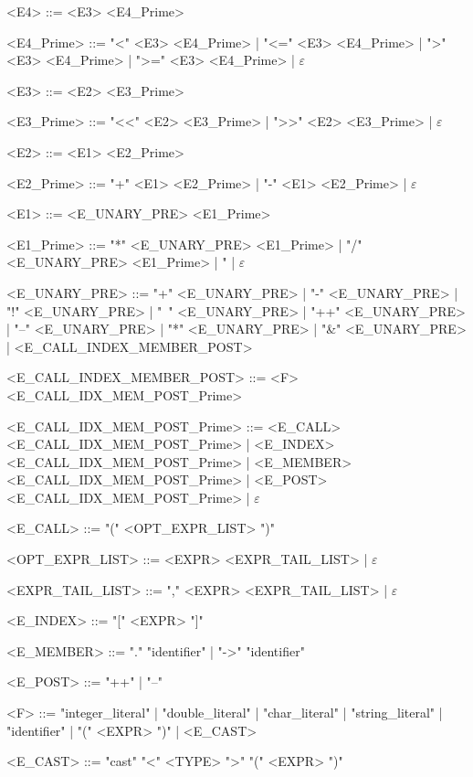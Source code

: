 \begin{grammar}
<E4> ::= <E3> <E4\_Prime>

<E4\_Prime> ::= "<" <E3> <E4\_Prime>
              | "<=" <E3> <E4\_Prime>
              | ">" <E3> <E4\_Prime>
              | ">=" <E3> <E4\_Prime>
              | $\varepsilon$

<E3> ::= <E2> <E3\_Prime>

<E3\_Prime> ::= "<<" <E2> <E3\_Prime>
              | ">>" <E2> <E3\_Prime>
              | $\varepsilon$

<E2> ::= <E1> <E2\_Prime>

<E2\_Prime> ::= "+" <E1> <E2\_Prime>
              | "-" <E1> <E2\_Prime>
              | $\varepsilon$

<E1> ::= <E\_UNARY\_PRE> <E1\_Prime>

<E1\_Prime> ::= "*" <E\_UNARY\_PRE> <E1\_Prime>
              | "/" <E\_UNARY\_PRE> <E1\_Prime>
              | "%
              | $\varepsilon$

<E\_UNARY\_PRE> ::= "+" <E\_UNARY\_PRE>
                  | "-" <E\_UNARY\_PRE>
                  | "!" <E\_UNARY\_PRE>
                  | "~" <E\_UNARY\_PRE>
                  | "++" <E\_UNARY\_PRE>
                  | "--" <E\_UNARY\_PRE>
                  | "*" <E\_UNARY\_PRE>
                  | "&" <E\_UNARY\_PRE>
                  | <E\_CALL\_INDEX\_MEMBER\_POST>

<E\_CALL\_INDEX\_MEMBER\_POST> ::= <F> <E\_CALL\_IDX\_MEM\_POST\_Prime>

<E\_CALL\_IDX\_MEM\_POST\_Prime> ::= <E\_CALL> <E\_CALL\_IDX\_MEM\_POST\_Prime>
                                   | <E\_INDEX> <E\_CALL\_IDX\_MEM\_POST\_Prime>
                                   | <E\_MEMBER> <E\_CALL\_IDX\_MEM\_POST\_Prime>
                                   | <E\_POST> <E\_CALL\_IDX\_MEM\_POST\_Prime>
                                   | $\varepsilon$

<E\_CALL> ::= "(" <OPT\_EXPR\_LIST> ")"

<OPT\_EXPR\_LIST> ::= <EXPR> <EXPR\_TAIL\_LIST>
                    | $\varepsilon$

<EXPR\_TAIL\_LIST> ::= "," <EXPR> <EXPR\_TAIL\_LIST>
                     | $\varepsilon$

<E\_INDEX> ::= "[" <EXPR> "]"

<E\_MEMBER> ::= "." "identifier"
              | "->" "identifier"

<E\_POST> ::= "++"
            | "--"

<F> ::= "integer_literal"
      | "double_literal"
      | "char_literal"
      | "string_literal"
      | "identifier"
      | "(" <EXPR> ")"
      | <E\_CAST>

<E\_CAST> ::= "cast" "<" <TYPE> ">" "(" <EXPR> ")"
\end{grammar}